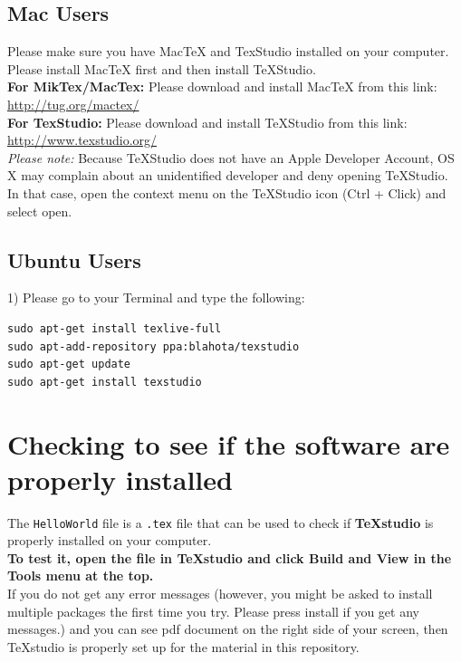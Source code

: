 \documentclass[]{article}
\begin{document}
\subsection*{Mac Users}
Please make sure you have MacTeX and TexStudio installed on your computer. Please install MacTeX first and then install TeXStudio.  \\

\textbf{For MikTex/MacTex:}
Please download and install MacTeX from this link: \url{http://tug.org/mactex/} \\

\textbf{For TexStudio:}
Please download and install TeXStudio from this link: \url{http://www.texstudio.org/} \\

\textit{Please note:} Because TeXStudio does not have an Apple Developer Account, OS X may complain about an unidentified developer and deny opening TeXStudio. In that case, open the context menu on the TeXStudio icon (Ctrl + Click) and select open.

\subsection*{Ubuntu Users}

1) Please go to your Terminal and type the following:
\begin{verbatim}
sudo apt-get install texlive-full
sudo apt-add-repository ppa:blahota/texstudio
sudo apt-get update
sudo apt-get install texstudio
\end{verbatim}


\section*{Checking to see if the software are properly installed}

The \texttt{HelloWorld} file is a \texttt{.tex} file that can be used to check if \textbf{TeXstudio} is properly installed on your computer. \\

\textbf{To test it, open the file in TeXstudio and click Build and View in the Tools menu at the top. } \\

If you do not get any error messages (however, you might be asked to install multiple packages the first time you try. Please press install if you get any messages.) and you can see pdf document on the right side of your screen,  then TeXstudio is properly set up for the material in this repository.
\end{document}
